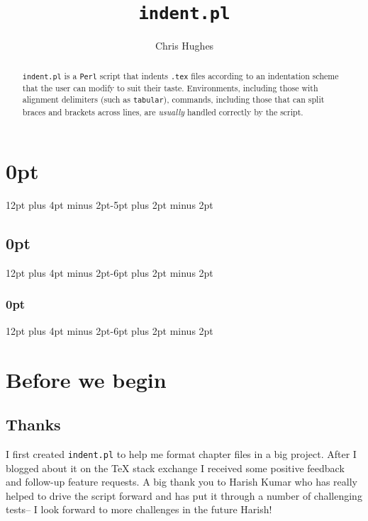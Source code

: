 \titlespacing\section{0pt}{12pt plus 4pt minus 2pt}{-5pt plus 2pt minus 2pt}
\titlespacing\subsection{0pt}{12pt plus 4pt minus 2pt}{-6pt plus 2pt minus 2pt}
\titlespacing\subsubsection{0pt}{12pt plus 4pt minus 2pt}{-6pt plus 2pt minus 2pt}





\title{\lstinline[basicstyle=\huge\ttfamily]!indent.pl!}
\author{Chris Hughes}
\maketitle
\begin{abstract}
	\lstinline!indent.pl! is a \lstinline!Perl! script that indents \lstinline!.tex!
	files according to an indentation scheme that the user can modify to suit their 
	taste. Environments, including those with alignment delimiters (such as \lstinline!tabular!), 
	commands, including those that can split braces and brackets across lines, 
	are \emph{usually} handled correctly by the script.
\end{abstract}

\tableofcontents
\lstlistoflistings

\section{Before we begin}
 \subsection{Thanks}
 	I first created \lstinline!indent.pl! to help me format chapter files 
 	in a big project. After I blogged about it on the 
 	\TeX{} stack exchange \cite{cmhblog} I received some positive feedback and 
 	follow-up feature requests. A big thank you to Harish Kumar who has really 
 	helped to drive the script forward and has put it through a number of challenging
 	tests-- I look forward to more challenges in the future Harish!
 	 	 	 	 	
